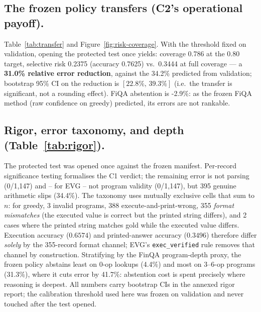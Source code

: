 \documentclass[conference]{IEEEtran}
\begin{document}
\subsection{The frozen policy transfers (C2's operational payoff).}
Table~\ref{tab:transfer} and Figure~\ref{fig:risk-coverage}. With the threshold fixed on validation, opening the protected test
once yields: coverage 0.786 at the 0.80 target, selective risk 0.2375 (accuracy 0.7625)
vs.\ 0.3444 at full coverage --- a \textbf{31.0\% relative error reduction}, against the
34.2\% predicted from validation; bootstrap 95\% CI on the reduction is $[22.8\%,\,39.3\%]$
(i.e.\ the transfer is significant, not a rounding effect). FiQA abstention is -2.9\%: as the frozen FiQA method (raw
confidence on greedy) predicted, its errors are not rankable.

\subsection{Rigor, error taxonomy, and depth (Table~\ref{tab:rigor}).}
The protected test was opened once against the frozen manifest. Per-record significance
testing formalises the C1 verdict; the remaining error is not parsing (0/1,147) and --
for EVG -- not program validity (0/1,147), but 395 genuine arithmetic slips (34.4\%).
The taxonomy uses mutually exclusive cells that sum to $n$: for greedy, 3 invalid
programs, 388 execute-and-print-wrong, 355 \emph{format mismatches} (the executed value is
correct but the printed string differs), and 2 cases where the printed string matches gold
while the executed value differs. Execution accuracy ($0.6574$) and printed-answer accuracy
($0.3496$) therefore differ \emph{solely} by the 355-record format channel; EVG's
\texttt{exec\_verified} rule removes that channel by construction. Stratifying by the FinQA
program-depth proxy, the frozen policy abstains least on 0-op lookups (4.4\%) and most on
3--6-op programs (31.3\%), where it cuts error by 41.7\%: abstention cost is spent precisely
where reasoning is deepest. All numbers carry bootstrap CIs in the annexed rigor report; the
calibration threshold used here was frozen on validation and never touched after the test
opened.
\end{document}
